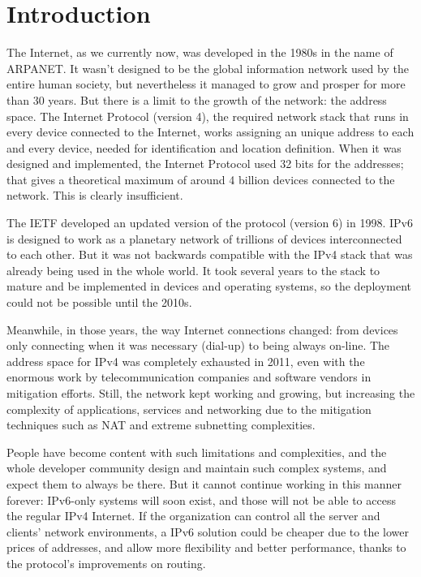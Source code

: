 \chapter{Introduction}

The Internet, as we currently now, was developed in the 1980s in the name of ARPANET. It wasn't designed to be the global information network used by the entire human society, but nevertheless it managed to grow and prosper for more than 30 years. But there is a limit to the growth of the network: the address space. The Internet Protocol (version 4), the required network stack that runs in every device connected to the Internet, works assigning an unique address to each and every device, needed for identification and location definition. When it was designed and implemented, the Internet Protocol used 32 bits for the addresses; that gives a theoretical maximum of around 4 billion devices connected to the network. This is clearly insufficient.

The IETF developed an updated version of the protocol (version 6) in 1998. IPv6 is designed to work as a planetary network of trillions of devices interconnected to each other. But it was not backwards compatible with the IPv4 stack that was already being used in the whole world. It took several years to the stack to mature and be implemented in devices and operating systems, so the deployment could not be possible until the 2010s. 

Meanwhile, in those years, the way Internet connections changed: from devices only connecting when it was necessary (dial-up) to being always on-line. The address space for IPv4 was completely exhausted in 2011, even with the enormous work by telecommunication companies and software vendors in mitigation efforts. Still, the network kept working and growing, but increasing the complexity of applications, services and networking due to the mitigation techniques such as NAT and extreme subnetting complexities.

People have become content with such limitations and complexities, and the whole developer community design and maintain such complex systems, and expect them to always be there. But it cannot continue working in this manner forever: IPv6-only systems will soon exist, and those will not be able to access the regular IPv4 Internet. If the organization can control all the server and clients' network environments, a IPv6 solution could be cheaper due to the lower prices of addresses, and allow more flexibility and better performance, thanks to the protocol's improvements on routing.

